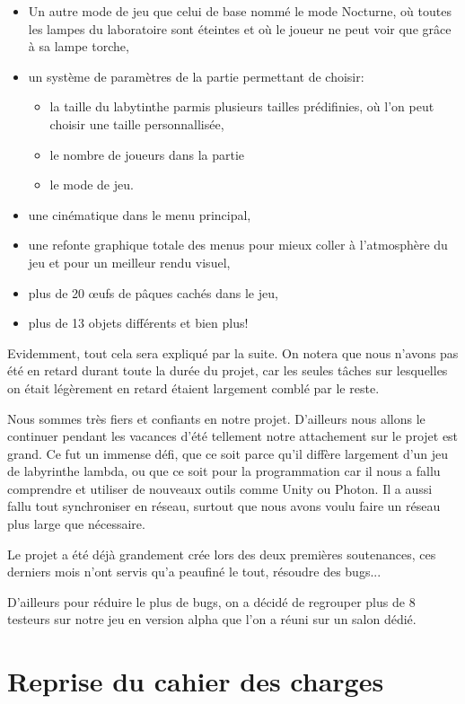 \documentclass{article}
\begin{document}
\begin{itemize}
\item Un autre mode de jeu que celui de base nommé le mode Nocturne, où toutes les lampes du laboratoire sont éteintes et où le joueur ne peut voir que grâce à sa lampe torche,
\item un système de paramètres de la partie permettant de choisir:
\begin{itemize}
\item la taille du labytinthe parmis plusieurs tailles prédifinies, où l'on peut choisir une taille personnallisée,
\item le nombre de joueurs dans la partie
\item le mode de jeu.
\end{itemize}
\item une cinématique dans le menu principal,
\item une refonte graphique totale des menus pour mieux coller à l'atmosphère du jeu et pour un meilleur rendu visuel, 
\item plus de 20 œufs de pâques cachés dans le jeu,
\item plus de 13 objets différents et bien plus!
\end{itemize}

Evidemment, tout cela sera expliqué par la suite. On notera que nous n'avons pas été en retard durant toute la durée du projet, car les seules tâches sur lesquelles on était légèrement en retard étaient largement comblé par le reste.

Nous sommes très fiers et confiants en notre projet. D'ailleurs nous allons le continuer pendant les vacances d'été tellement notre attachement sur le projet est grand. Ce fut un immense défi, que ce soit parce qu'il diffère largement d'un jeu de labyrinthe lambda, ou que ce soit pour la programmation car il nous a fallu comprendre et utiliser de nouveaux outils comme Unity ou Photon. Il a aussi fallu tout synchroniser en réseau, surtout que nous avons voulu faire un réseau plus large que nécessaire.

Le projet a été déjà grandement crée lors des deux premières soutenances, ces derniers mois n'ont servis qu'a peaufiné le tout, résoudre des bugs...

D'ailleurs pour réduire le plus de bugs, on a décidé de regrouper plus de 8 testeurs sur notre jeu en version alpha que l'on a réuni sur un salon dédié.

\newpage
\section{Reprise du cahier des charges}
\end{document}
